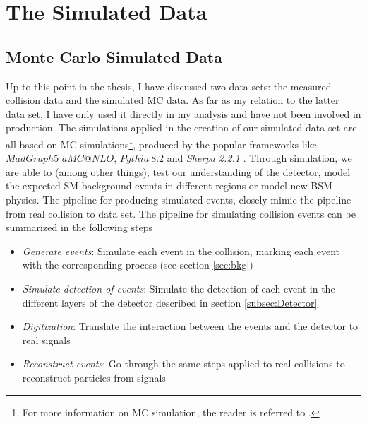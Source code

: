 \section{The Simulated Data}
\subsection{Monte Carlo Simulated Data}
Up to this point in the thesis, I have discussed two data sets: the measured collision data and the simulated \ac{MC} data. 
As far as my relation to the latter data set, I have only used it directly in my analysis and have not been involved in 
production. The simulations applied in the creation of our simulated data set are all based on \acf{MC} simulations\footnote{For 
more information on \ac{MC} simulation, the reader is referred to \cite{raychaudhuri_introduction_2008}.}, produced 
by the popular frameworks like \emph{$MadGraph5\_aMC@NLO$}, \emph{$Pythia\ 8.2$} and \emph{Sherpa 2.2.1} \cite{alwall_automated_2014, sjostrand_introduction_2015,Sherpa}. 
Through simulation, we are able to (among other things); test our understanding of the detector, model the expected \ac{SM} background 
events in different regions or model new \ac{BSM} physics. The pipeline for producing simulated events, closely mimic the pipeline 
from real collision to data set. The pipeline for simulating collision events can be summarized in the following steps
\begin{itemize}
  \item \emph{Generate events}: Simulate each event in the collision, marking each event with the corresponding process (see section \ref{sec:bkg})
  \item \emph{Simulate detection of events}: Simulate the detection of each event in the different layers of the detector described in section \ref{subsec:Detector}
  \item \emph{Digitization}: Translate the interaction between the events and the detector to real signals
  \item \emph{Reconstruct events}: Go through the same steps applied to real collisions to reconstruct particles from signals
\end{itemize}
